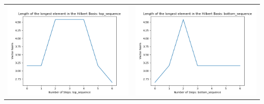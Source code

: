 \documentclass[10pt]{article}
\begin{document}
\begin{tabular}{c|c}
\begin{minipage}{.4\textwidth}
\includegraphics[width=\textwidth]{"DATA/5d/6 generators 1 bound I/top_sequence LENGTH"}
\end{minipage} &
\begin{minipage}{.4\textwidth}
\includegraphics[width=\textwidth]{"DATA/5d/6 generators 1 bound I bottomup/bottom_sequence LENGTH"}
\end{minipage}
\end{tabular}
\end{document}
